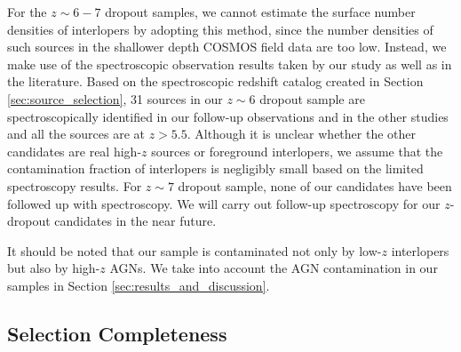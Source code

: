 \documentclass[]{pasj01}
\begin{document}
For the $z \sim 6-7$ dropout samples, 
we cannot estimate the surface number densities of interlopers 
by adopting this method, 
since the number densities of such sources 
in the shallower depth COSMOS field data 
are too low. 
Instead, 
we make use of the spectroscopic observation results 
taken by our study as well as in the literature.
Based on the spectroscopic redshift catalog 
created in Section \ref{sec:source_selection}, 
31 sources in our $z \sim 6$ dropout sample 
are spectroscopically identified 
in our follow-up observations and in the other studies 
and all the sources are at $z > 5.5$. 
%
Although 
it is unclear whether the other candidates are real high-$z$ sources or foreground interlopers, 
we assume that the contamination fraction of interlopers is negligibly small 
based on the limited spectroscopy results. 
For $z\sim 7$ dropout sample, 
none of our candidates 
have been followed up with spectroscopy.
We will carry out follow-up spectroscopy for our $z$-dropout candidates 
in the near future. 



It should be noted that 
our sample is contaminated 
not only by low-$z$ interlopers but also by high-$z$ AGNs. 
We take into account the AGN contamination 
in our samples in Section \ref{sec:results_and_discussion}. 



\subsection{Selection Completeness} \label{sec:selection_completeness}
\end{document}
